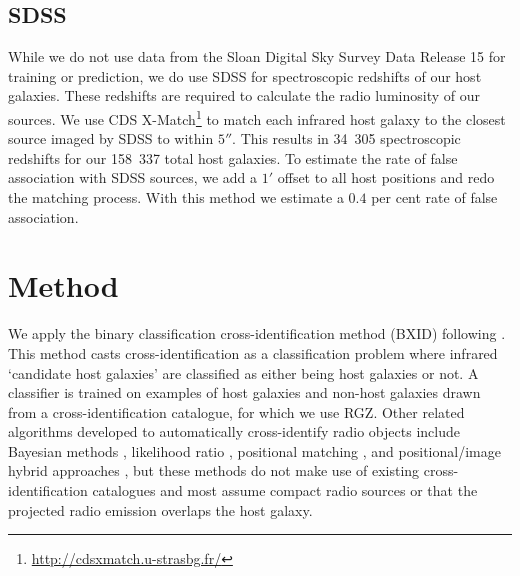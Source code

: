 \documentclass[11pt, a4paper]{book}
\newcommand{\nsources}{158~337}
\newcommand{\nsourceszsp}{34~305}
\begin{document}
    \subsection{SDSS} \label{sec:rlfs-sdss-data}

    While we do not use data from the Sloan Digital Sky Survey Data Release 15 \citep[SDSS;][]{sdss} for training or prediction, we do use SDSS for spectroscopic redshifts of our host galaxies. These redshifts are required to calculate the radio luminosity of our sources. We use CDS X-Match\footnote{\url{http://cdsxmatch.u-strasbg.fr/}} to match each infrared host galaxy to the closest source imaged by SDSS to within $5''$. This results in \nsourceszsp{} spectroscopic redshifts for our \nsources{} total host galaxies. To estimate the rate of false association with SDSS sources, we add a $1'$ offset to all host positions and redo the matching process. With this method we estimate a $0.4$ per cent rate of false association.

\section{Method}\label{sec:rlfs-method}

We apply the binary classification cross-identification method (BXID) following \citet{alger18radio}. This method casts cross-identification
as a classification problem where infrared `candidate host galaxies' are
classified as either being host galaxies or not. A classifier is trained
on examples of host galaxies and non-host galaxies drawn from a
cross-identification catalogue, for which we use RGZ. Other related
algorithms developed to automatically cross-identify radio objects
include Bayesian methods \citep{fan15}, likelihood ratio \citep{weston18lrpy},
 positional matching \citep[e.g.][]{kimball08, norris06, middelberg08}, and positional/image hybrid approaches \citep{van_velzen_radio_2012}, but these methods do not make use of existing
cross-identification catalogues and most assume compact radio sources or that the projected radio emission overlaps the host galaxy.
\end{document}
